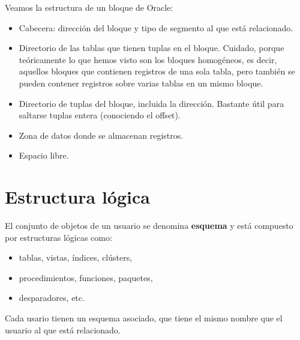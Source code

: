 Veamos la estructura de un bloque de Oracle:
\begin{itemize}
\item Cabecera: dirección del bloque y tipo de segmento al que está relacionado.
\item Directorio de las tablas que tienen tuplas en el bloque. Cuidado, porque teóricamente lo que hemos visto son los bloques homogéneos, es decir, aquellos bloques que contienen registros de una sola tabla, pero también se pueden contener registros sobre varias tablas en un mismo bloque.
\item Directorio de tuplas del bloque, incluida la dirección. Bastante útil para saltarse tuplas entera (conociendo el offset).
\item Zona de datos donde se almacenan registros. 
\item Espacio libre.
\end{itemize}

\section{Estructura lógica}

El conjunto de objetos de un usuario se denomina \textbf{esquema} y está compuesto por estructuras lógicas como:
\begin{itemize}
\item tablas, vistas, índices, clústers,
\item procedimientos, funciones, paquetes,
\item desparadores, etc.
\end{itemize}
Cada usario tienen un esquema asociado, que tiene el mismo nombre que el usuario al que está relacionado. 

